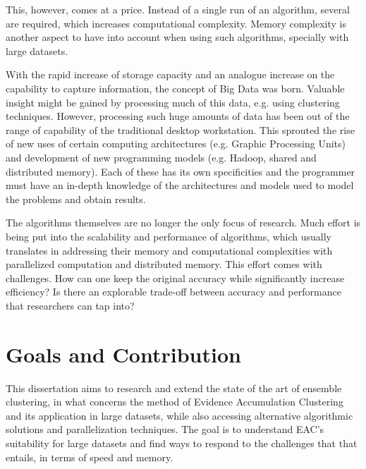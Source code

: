 This, however, comes at a price.
Instead of a single run of an algorithm, several are required, which increases computational complexity.
Memory complexity is another aspect to have into account when using such algorithms, specially with large datasets.

With the rapid increase of storage capacity and an analogue increase on the capability to capture information, the concept of Big Data was born. %
Valuable insight might be gained by processing much of this data, e.g. using clustering techniques.
However, processing such huge amounts of data has been out of the range of capability of the traditional desktop workstation.
This sprouted the rise of new uses of certain computing architectures (e.g. Graphic Processing Units) and development of new programming models (e.g. Hadoop, shared and distributed memory).
Each of these has its own specificities and the programmer must have an in-depth knowledge of the architectures and models used to model the problems and obtain results.

The algorithms themselves are no longer the only focus of research.
Much effort is being put into the scalability and performance of algorithms, which usually translates in addressing their memory and computational complexities with parallelized computation and distributed memory.
This effort comes with challenges.
How can one keep the original accuracy while significantly increase efficiency? Is there an explorable trade-off between accuracy and performance that researchers can tap into?



\section{Goals and Contribution}

This dissertation aims to research and extend the state of the art of ensemble clustering, in what concerns the method of Evidence Accumulation Clustering and its application in large datasets, while also accessing alternative algorithmic solutions and parallelization techniques.
The goal is to understand EAC's suitability for large datasets and find ways to respond to the challenges that that entails, in terms of speed and memory.

